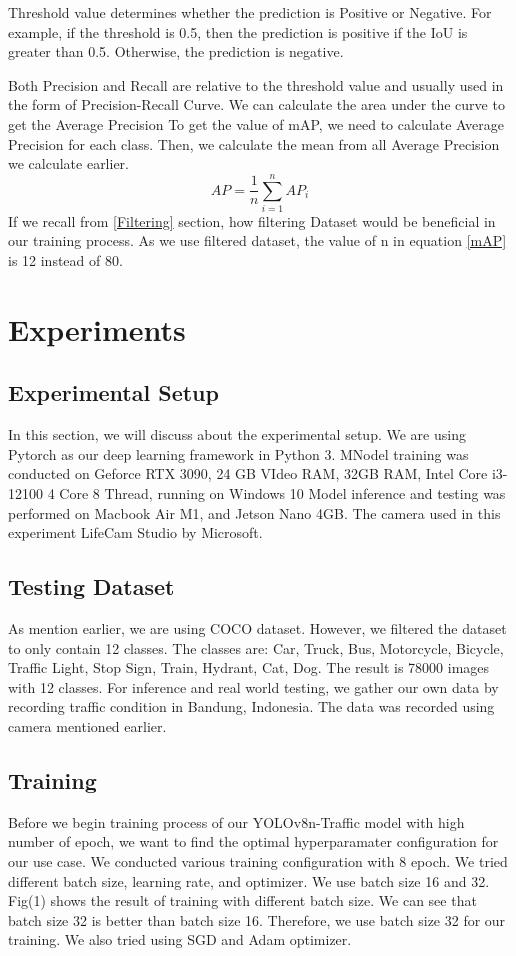 \documentclass[conference]{IEEEtran}
\begin{document}
Threshold value determines whether the prediction is Positive or Negative. For example, if the threshold is 0.5, then the prediction is positive if the IoU is greater than 0.5. Otherwise, the prediction is negative.

Both Precision and Recall are relative to the threshold value and usually used in the form of Precision-Recall Curve. We can calculate the area under the curve to get the Average Precision
To get the value of mAP, we need to calculate Average Precision for each class. Then, we calculate the mean from all Average Precision we calculate earlier.
\begin{equation}
AP = \frac{1}{n}\sum_{i=1}^{n}AP_i
\label{mAP}
\end{equation}
If we recall from \ref{Filtering} section, how filtering Dataset would be beneficial in our training process. As we use filtered dataset, the value of n in equation \ref{mAP} is 12 instead of 80.

\section{Experiments}


\subsection{Experimental Setup}
In this section, we will discuss about the experimental setup. We are using Pytorch as our deep learning framework in Python  3.
MNodel training was conducted on Geforce RTX 3090, 24 GB VIdeo RAM, 32GB RAM, Intel Core i3-12100 4 Core 8 Thread, running on Windows 10
Model inference and testing was performed on Macbook Air M1, and Jetson Nano 4GB. The camera used in this experiment  LifeCam Studio by Microsoft.

\subsection{Testing Dataset}
As mention earlier, we are using COCO dataset. However, we filtered the dataset to only contain 12 classes. The classes are:
Car, Truck, Bus, Motorcycle, Bicycle, Traffic Light, Stop Sign, Train, Hydrant, Cat, Dog. The result is 78000 images with 12 classes.
For inference and real world testing, we gather our own data by recording traffic condition in Bandung, Indonesia. The data was recorded using camera mentioned earlier.

\subsection{Training}
Before we begin training process of our YOLOv8n-Traffic model with high number of epoch, we want to find the optimal hyperparamater configuration for our use case. We conducted various training configuration with 8 epoch.
We tried different batch size, learning rate, and optimizer. We use batch size 16 and 32. Fig(1) shows the result of training with different batch size. We can see that batch size 32 is better than batch size 16. Therefore, we use batch size 32 for our training.
We also tried using SGD and Adam optimizer.
\end{document}
